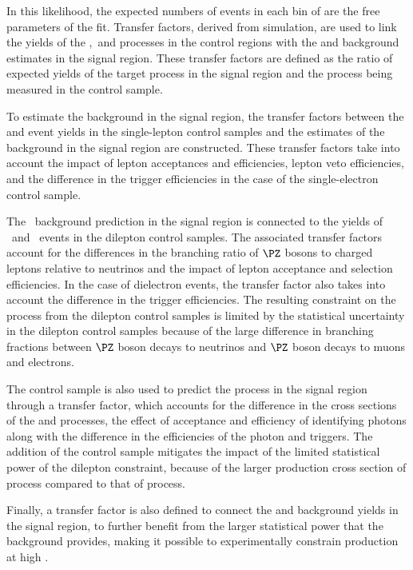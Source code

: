In this likelihood, the expected numbers of \Zvvjets events in each
bin of \ptmiss are the free parameters of the fit. Transfer factors, derived from simulation,
are used to link the yields of the \Zlljets,~\Wlvjets and \phojets processes in the control
regions with the \Zvvjets and \Wlvjets background estimates in the signal region.
These transfer factors are defined as the ratio of expected yields of the target process
in the signal region and the process being measured in the control sample.

To estimate the \Wlvjets background in the signal region, the transfer factors between
the \Wmvjets and \Wevjets event yields in the single-lepton control samples and
the estimates of the \Wlvjets  background in the signal region are constructed. These transfer factors take into account
the impact of lepton acceptances and efficiencies, lepton veto efficiencies, and
the difference in the trigger efficiencies in the case of the single-electron control sample.

The \Zvv~background prediction in the signal region is connected to the yields of \Zmm~and \Zee~events
in the dilepton control samples. The associated transfer factors account for the differences in the
branching ratio of $\PZ$ bosons to charged leptons relative to neutrinos
and the impact of lepton acceptance and selection
efficiencies. In the case of dielectron events, the transfer factor also takes into account the
difference in the trigger efficiencies. The resulting constraint on the \Zvvjets process from the dilepton
control samples is limited by the statistical uncertainty in the dilepton control samples
because of the large difference in branching fractions between $\PZ$ boson decays to neutrinos
and $\PZ$ boson decays to muons and electrons.

The \phojets control sample is also used to predict the \Zvvjets process in the signal region through a
transfer factor, which accounts for the difference in the cross sections of the \phojets and \Zvvjets processes,
the effect of acceptance and efficiency of identifying photons along with the difference in the efficiencies of
the photon and \ptmiss triggers. The addition of the \phojets control sample mitigates the impact of the limited
statistical power of the dilepton constraint, because of the larger production cross section of \phojets process compared to that of \Zvvjets process.

Finally, a transfer factor is also defined to connect the \Zvvjets and \Wlvjets background yields
in the signal region, to further benefit from the larger statistical power that
the \Wlvjets background provides, making it possible to experimentally
constrain \Zvvjets production at high \ptmiss.

